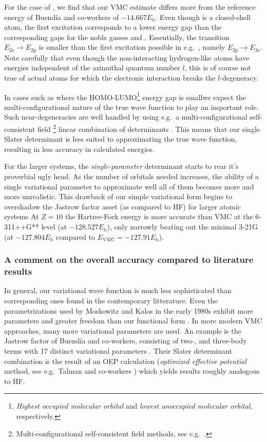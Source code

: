 \documentclass[../../master.tex]{subfiles}
\begin{document}
For the case of , we find that our VMC estimate differs more from the reference energy of Buendía and co-workers of $-14.667 E_h$. Even though  is a closed-shell atom, the first excitation corresponds to a lower energy gap than the corresponding gaps for the noble gasses  and . Essentially, the transition $E_\text{2s}\rightarrow E_\text{2p}$ is smaller than the first excitation possible in e.g.\ , namely $E_\text{2p}\rightarrow E_\text{3s}$. Note carefully that even though the non-interacting hydrogen-like atoms have energies independent of the azimuthal quantum number $l$, this is of course not true of actual atoms for which the electronic interaction breaks the $l$-degeneracy.  

In cases such as \textemdash where the HOMO-LUMO\footnote{\emph{Highest occupied molecular orbital} and \emph{lowest unoccupied molecular orbital}, respectively.} energy gap is small\textemdash we expect the multi-configurational nature of the true wave function to play an important role. Such near-degeneracies are well handled by using e.g.\ a multi-configurational self-consistent field \footnote{Multi-configurational self-consistent field methods, see e.g.\ \cite{helgaker}.} linear combination of determinants \cite{BUENDIA2006241}. This means that our single Slater determinant is less suited to approximating the true wave function, resulting in less accuracy in calculated energies.

For the larger systems, the \emph{single-parameter} determinant starts to rear it's proverbial ugly head. As the number of orbitals needed increases, the ability of a single variational parameter to approximate well all of them becomes more and more unrealistic. This drawback of our simple variational form begins to overshadow the Jastrow factor asset (as compared to HF) for larger atomic systems At $Z=10$ the Hartree-Fock energy is more accurate than VMC at the 6-311++G** level (at $-128.527 E_h$), only narrowly beating out the minimal 3-21G (at $-127.804 E_h$ compared to $E_\text{VMC}=-127.91 E_h$).

\subsubsection{A comment on the overall accuracy compared to literature results}
In general, our variational wave function is much less sophisticated than corresponding ones found in the contemporary litterature. Even the parametrizations used by Moskowitz and Kalos in the early 1980s exhibit more parameters and greater freedom than our functional form \cite{moskowitz1981new}. In more modern VMC approaches, many more variational parameters are used. An example is the Jastrow factor of Buendía and co-workers, consisting of two-, and three-body terms with 17 distinct variational parameters \cite{buendia}. Their Slater determinant combination is the result of an OEP calculation (\emph{optimized effective potential} method, see e.g.\ Talman and co-workers \cite{talman1976optimized}) which yields results roughly analogous to HF.  
\end{document}
